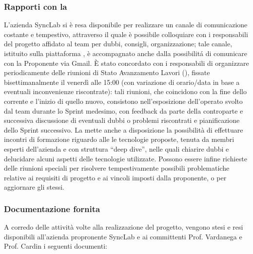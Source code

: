 \subsubsection{Rapporti con la }
L'azienda SyncLab si è resa disponibile per realizzare un canale di comunicazione costante e tempestivo, attraverso il quale è possibile colloquiare con i responsabili del progetto affidato al team per dubbi, consigli, organizzazione; tale canale, istituito sulla piattaforma , è accompagnato anche dalla possibilitá di comunicare con la Proponente via Gmail. È stato concordato con i responsabili di organizzare periodicamente delle riunioni di Stato Avanzamento Lavori (), fissate bisettimanalmente il venerdì alle 15:00 (con variazione di orario/data in base a eventuali inconvenienze riscontrate): tali riunioni, che coincidono con la fine dello  corrente e l'inizio di quello nuovo, consistono nell'esposizione dell'operato svolto dal team durante lo Sprint medesimo, con feedback da parte della controparte e successiva discussione di eventuali dubbi o problemi riscontrati e pianificazione dello Sprint successivo.
La  mette anche a disposizione la possibilità di effettuare incontri di formazione riguardo alle le tecnologie proposte, tenuta da membri esperti dell'azienda e con struttura ``deep dive'', nelle quali chiarire dubbi e delucidare alcuni aspetti delle tecnologie utilizzate. 
Possono essere infine richieste delle riunioni speciali per risolvere tempestivamente possibili problematiche relative ai requisiti di progetto e ai vincoli imposti dalla proponente, o per aggiornare gli stessi.

\subsubsection{Documentazione fornita}
A corredo delle attività volte alla realizzazione del progetto, vengono stesi e resi disponibili all'azienda propronente SyncLab e ai committenti Prof. Vardanega e Prof. Cardin i seguenti documenti:

